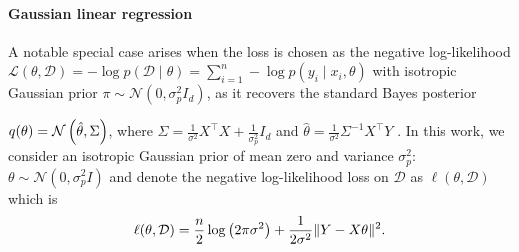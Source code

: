 \paragraph{Gaussian linear regression}
A notable special case 
arises when the loss is chosen as the negative log-likelihood $\mathcal{L}(\theta, \mathcal{D}) = - \log p(\mathcal{D} \mid \theta) = 
\sum_{i=1}^n - \log p(y_i \mid x_i, \theta)$ with isotropic Gaussian prior $\pi \sim \mathcal{N}(0, \sigma_p^2 I_d)$, as it recovers the standard Bayes posterior 
\iffalse
$q(\theta)$, where
$$q(\theta) = \frac{p(\mathcal{D} \mid \theta) \pi(\theta)}{\int p(\mathcal{D} \mid \theta^\prime)\pi(\theta^\prime) d\theta^\prime} = \mathcal{N}\lp \hat{\theta}, \Sigma \rp$$
\fi
$q(\theta)= \mathcal{N}\left( \hat{\theta}, \Sigma \right)$, where $\Sigma = \frac{1}{\sigma^2}X^\top X + \frac{1}{\sigma_p^2}I_d$ and $\hat{\theta} = \frac{1}{\sigma^2}\Sigma^{-1}X^\top Y$ \citep{bishop2007pattern}.
In this work, we consider an isotropic Gaussian prior of mean zero and variance $\sigma_p^2$: $\theta \sim \mathcal{N}(0, \sigma^2_p I)$ 
and denote the %
negative log-likelihood loss on $\mathcal{D}$ as $\ell(\theta, \mathcal{D})$ which is 
$$\ell(\theta, \mathcal{D}) = \frac{n}{2}\log \left( 2\pi \sigma^2 \right) + \frac{1}{2\sigma^2} \|Y - X\theta\|^2.$$

\iffalse
\textbf{Adversarial loss and adversarially robust posterior.} 
We define a novel adversarial loss $ {\ell}_\delta(\theta, \mathcal{D})$ in the Bayesian framework as 
\begin{align}
     {\ell}_\delta(\theta, \mathcal{D}) = \sum_{i=1}^n \max_{\|  \widetilde{x}_i - x_i \|_2 \leq \delta} - \log p(y_i \mid  \widetilde{x}_i, \theta) \label{eq:adv_loss}
\end{align} 
where $\delta$ controls the allowable perturbation in the features. The corresponding adversarially robust posterior $ {q}_\delta(\theta)$ is the Gibbs posterior with loss $\mathcal{L}(\theta, \mathcal{D}) =  {\ell}_\delta(\theta, \mathcal{D})$. This formulation is motivated by its equivalence to the adversarial training objective as proved in the following lemma. 

\begin{lemma}[Equivalence between adversarial loss and adversarial training] 
The point estimate obtained by optimizing $\arg\min_{\theta}  {\ell}_\delta(\theta, \mathcal{D})$ is equivalent to performing adversarial training with objective $\arg \min_{\theta} \sum_{i=1}^n \max_{\| \widetilde{x}_i -x_i\|_2 \leq \delta} \lp  \widetilde{x}_i^\top \theta - y_i \rp^2$.
\label{lm:adv_loss_adv_training}
\end{lemma}
\fi

